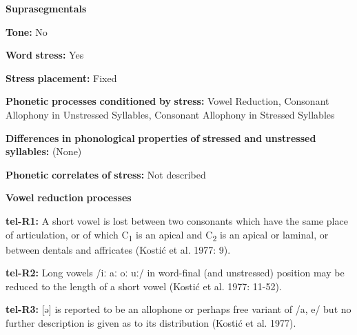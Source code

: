\documentclass[output=paper]{langsci/langscibook}
\begin{document}
\begin{styleBody}
\textbf{Suprasegmentals}
\end{styleBody}

\begin{styleBody}
\textbf{Tone:} No
\end{styleBody}

\begin{styleBody}
\textbf{Word} \textbf{stress:} Yes
\end{styleBody}

\begin{styleBody}
\textbf{Stress} \textbf{placement:} Fixed
\end{styleBody}

\begin{styleBody}
\textbf{Phonetic} \textbf{processes} \textbf{conditioned} \textbf{by} \textbf{stress:} Vowel Reduction, Consonant Allophony in Unstressed Syllables, Consonant Allophony in Stressed Syllables
\end{styleBody}

\begin{styleBody}
\textbf{Differences} \textbf{in} \textbf{phonological} \textbf{properties} \textbf{of} \textbf{stressed} \textbf{and} \textbf{unstressed} \textbf{syllables:} (None)
\end{styleBody}

\begin{styleBody}
\textbf{Phonetic} \textbf{correlates} \textbf{of} \textbf{stress:} Not described
\end{styleBody}

\begin{styleBody}
\textbf{Vowel} \textbf{reduction} \textbf{processes}
\end{styleBody}

\begin{styleBody}
\textbf{tel-R1:} A short vowel is lost between two consonants which have the same place of articulation, or of which C\textsubscript{1} is an apical and C\textsubscript{2} is an apical or laminal, or between dentals and affricates (Kostić et al. 1977: 9).
\end{styleBody}

\begin{styleBody}
\textbf{tel-R2:} Long vowels /iː aː oː uː/ in word-final (and unstressed) position may be reduced to the length of a short vowel (Kostić et al. 1977: 11-52).
\end{styleBody}

\begin{styleBody}
\textbf{tel-R3:} [ə] is reported to be an allophone or perhaps free variant of /a, e/ but no further description is given as to its distribution (Kostić et al. 1977).
\end{styleBody}
\end{document}
